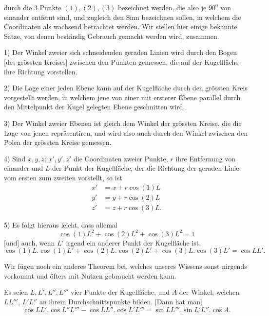%
durch die $3$ Punkte $(1),(2),(3)$ bezeichnet werden, die also je $90^{0}$ von einander entfernt sind, und zugleich den Sinn bezeichnen sollen, in welchem die Coordinaten als wachsend betrachtet werden. Wir stellen hier einige bekannte Sätze, von denen beständig Gebrauch gemacht werden wird, zusammen.

1) Der Winkel zweier sich schneidenden geraden Linien wird durch den Bogen [des grössten Kreises] zwischen den Punkten gemessen, die auf der Kugelfläche ihre Richtung vorstellen.

2) Die Lage einer jeden Ebene kann auf der Kugelfläche durch den grössten Kreis vorgestellt werden, in welchem jene von einer mit ersterer Ebene parallel durch den Mittelpunkt der Kugel gelegten Ebene geschnitten wird.

3) Der Winkel zweier Ebenen ist gleich dem Winkel der grössten Kreise, die die Lage von jenen repräsentiren, und wird also auch durch den Winkel zwischen den Polen der grössten Kreise gemessen.

4) Sind $x,y,z$; $x',y',z'$ die Coordinaten zweier Punkte, $r$ ihre Entfernung von einander und $L$ der Punkt der Kugelfläche, der die Richtung der geraden Linie vom ersten zum zweiten vorstellt, so ist
\[
\begin{aligned}
x'&=x+r\cos(1)L\\
y'&=y+r\cos(2)L\\
z'&=z+r\cos(3)L.
\end{aligned}
\]
\par\noindent\hspace*{1.2em}5) Es folgt hieraus leicht, dass allemal
\[
\cos(1)L^{2}+\cos(2)L^{2}+\cos(3)L^{2}=1
\]
[und] auch, wenn $L'$ irgend ein anderer Punkt der Kugelfläche ist,
\[
\cos(1)L.\cos(1)L'+\cos(2)L.\cos(2)L'+\cos(3)L.\cos(3)L'=\cos LL'.
\]

Wir fügen noch ein anderes Theorem bei, welches unseres Wissens sonst nirgends vorkommt und öfters mit Nutzen gebraucht werden kann.

Es seien $L,L',L'',L'''$ vier Punkte der Kugelfläche, und $A$ der Winkel, welchen $LL'''$, $L'L''$ an ihrem Durchschnittspunkte bilden. [Dann hat man]
\[
\cos LL'.\cos L''L'''-\cos LL''.\cos L'L'''=\sin LL'''.\sin L'L''.\cos A.
\]
